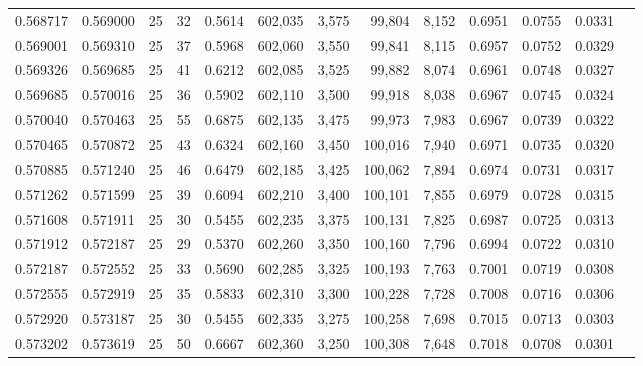 \begin{tabular}{rrrrrrrrrrrrr}
0.568717 & 0.569000 &    25 &  32 &                                     0.5614 & 602,035 &   3,575 &  99,804 &   8,152 & 0.6951 & 0.0755 & 0.0331 \\
0.569001 & 0.569310 &    25 &  37 &                                     0.5968 & 602,060 &   3,550 &  99,841 &   8,115 & 0.6957 & 0.0752 & 0.0329 \\
0.569326 & 0.569685 &    25 &  41 &                                     0.6212 & 602,085 &   3,525 &  99,882 &   8,074 & 0.6961 & 0.0748 & 0.0327 \\
0.569685 & 0.570016 &    25 &  36 &                                     0.5902 & 602,110 &   3,500 &  99,918 &   8,038 & 0.6967 & 0.0745 & 0.0324 \\
0.570040 & 0.570463 &    25 &  55 &                                     0.6875 & 602,135 &   3,475 &  99,973 &   7,983 & 0.6967 & 0.0739 & 0.0322 \\
0.570465 & 0.570872 &    25 &  43 &                                     0.6324 & 602,160 &   3,450 & 100,016 &   7,940 & 0.6971 & 0.0735 & 0.0320 \\
0.570885 & 0.571240 &    25 &  46 &                                     0.6479 & 602,185 &   3,425 & 100,062 &   7,894 & 0.6974 & 0.0731 & 0.0317 \\
0.571262 & 0.571599 &    25 &  39 &                                     0.6094 & 602,210 &   3,400 & 100,101 &   7,855 & 0.6979 & 0.0728 & 0.0315 \\
0.571608 & 0.571911 &    25 &  30 &                                     0.5455 & 602,235 &   3,375 & 100,131 &   7,825 & 0.6987 & 0.0725 & 0.0313 \\
0.571912 & 0.572187 &    25 &  29 &                                     0.5370 & 602,260 &   3,350 & 100,160 &   7,796 & 0.6994 & 0.0722 & 0.0310 \\
0.572187 & 0.572552 &    25 &  33 &                                     0.5690 & 602,285 &   3,325 & 100,193 &   7,763 & 0.7001 & 0.0719 & 0.0308 \\
0.572555 & 0.572919 &    25 &  35 &                                     0.5833 & 602,310 &   3,300 & 100,228 &   7,728 & 0.7008 & 0.0716 & 0.0306 \\
0.572920 & 0.573187 &    25 &  30 &                                     0.5455 & 602,335 &   3,275 & 100,258 &   7,698 & 0.7015 & 0.0713 & 0.0303 \\
0.573202 & 0.573619 &    25 &  50 &                                     0.6667 & 602,360 &   3,250 & 100,308 &   7,648 & 0.7018 & 0.0708 & 0.0301 \\

\end{tabular}
